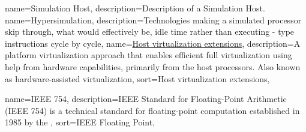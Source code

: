 \newcommand{\dvttermgpu}{\dvtcmdabbrev{dvtglossgpu}}
\newcommand{\dvttermgpgpu}{\dvtcmdabbrev{dvtglossgpgpu}}
\newcommand{\dvttermgoogle}{Google}
\newcommand{\dvttermgeavionics}{GE Aviation}
\newcommand{\dvttermgui}{\dvtcmdabbrev{dvtglossgui}}

{
  name={Simulation Host},
  description={Description of a Simulation Host.}
}
\newcommand{\dvttermhost}{\dvtcmdcaponcegloss{dvtglosshost}{Host}}
\newcommand{\dvttermhewlettpackard}{Hewlett-Packard Company}
\newcommand{\dvttermhoneywell}{Honeywell International, Inc.}
{
  name={Hypersimulation},
  description={Technologies making a simulated processor skip through, what would effectively be, idle time rather than executing - type instructions cycle by cycle},
}
\newcommand{\dvttermhypersimulation}{\dvtcmdcaponcegloss{dvtglosshypersimulation}{Hypersimulation}}
{
  name={\href{http://en.wikipedia.org/wiki/Hardware-assisted_virtualization}{Host virtualization extensions}},
  description={A platform virtualization approach that enables efficient full virtualization using help from hardware capabilities, primarily from the host processors. Also known as hardware-assisted virtualization},
  sort={Host virtualization extensions},
}
\newcommand{\dvttermhostvirtualizationextensions}{\dvtcmdcaponcegloss{dvtglosshostvirtualizationextensions}{Host Virtualization Extensions}}
\newcommand{\dvttermhaxm}{\dvttermintel\ \dvtcmdabbrev{dvtglosshaxm}}

\newcommand{\dvtterminterpretation}{\dvtcmdcaponce{Interpretation}}
\newcommand{\dvttermintel}{Intel\circledR}
\newcommand{\dvttermintelcoreiseven}{\dvttermintel\ Core\texttrademark\ i7}
\newcommand{\dvttermibm}{IBM}
\newcommand{\dvttermisa}{\dvtcmdabbrev{dvtglossisa}}
\newcommand{\dvttermieee}{\dvtcmdabbrev{dvtglossieee}}
{
  name={IEEE 754},
  description={IEEE Standard for Floating-Point Arithmetic (IEEE 754) is a technical standard for floating-point computation established in 1985 by the \dvttermieee },
  sort={IEEE Floating Point},
}
\newcommand{\dvttermieeefp}{\glslink{dvtglossieeefp}{IEEE 754}}
\newcommand{\dvttermios}{iOS}

